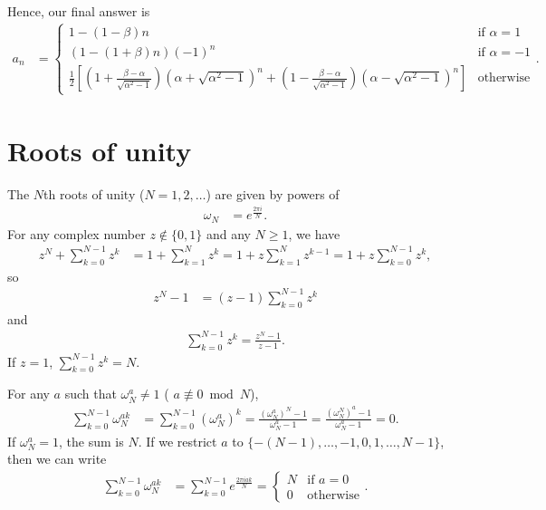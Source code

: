 Hence, our final answer is
\begin{align}
	a_n
	&= \begin{cases}
			1 - (1 - \beta) n & \text{if } \alpha = 1 \\
			(1 - (1 + \beta) n) (-1)^n & \text{if } \alpha = -1 \\
			\frac{1}{2} \left[
					\left( 1 + \frac{\beta - \alpha}{\sqrt{\alpha^2 - 1}} \right) \left( \alpha + \sqrt{\alpha^2 - 1} \right)^n
					+ \left( 1 - \frac{\beta - \alpha}{\sqrt{\alpha^2 - 1}} \right) \left( \alpha - \sqrt{\alpha^2 - 1} \right)^n
			\right] & \text{otherwise}
		\end{cases}.
			\label{eq:recurrence-relation}
\end{align}


\section{Roots of unity}

The $N$th roots of unity ($N = 1, 2, \ldots$) are given by powers of
\begin{align}
	\omega_N
	&= e^{\frac{2 \pi i}{N}}.
\end{align}
For any complex number $z \not\in \{ 0, 1 \}$ and any $N \ge 1$, we have
\begin{align}
	z^N + \sum_{k=0}^{N-1} z^k
	&= 1 + \sum_{k=1}^{N} z^k
	= 1 + z \sum_{k=1}^{N} z^{k-1}
	= 1 + z \sum_{k=0}^{N-1} z^k,
\end{align}
so
\begin{align}
	z^N - 1
	&= (z - 1) \sum_{k=0}^{N-1} z^k
\end{align}
and
\begin{align}
	\sum_{k=0}^{N-1} z^k
	= \frac{z^N - 1}{z - 1}.
\end{align}
If $z = 1$, $\sum_{k=0}^{N-1} z^k = N$.

For any $a$ such that $\omega_N^a \ne 1$ (\ie{} $a \not\equiv 0 \bmod{N}$),
\begin{align}
	\sum_{k=0}^{N-1} \omega_N^{a k}
	&= \sum_{k=0}^{N-1} (\omega_N^a)^k
	= \frac{(\omega_N^a)^N - 1}{\omega_N^a - 1}
	= \frac{(\omega_N^N)^a - 1}{\omega_N^a - 1}
	= 0.
\end{align}
If $\omega_N^a = 1$, the sum is $N$.
If we restrict $a$ to $\{ -(N-1), \ldots, -1, 0, 1, \ldots, N-1 \}$, then we can write
\begin{align}
	\sum_{k=0}^{N-1} \omega_N^{a k}
	&= \sum_{k=0}^{N-1} e^{\frac{2 \pi i a k}{N}}
	= \begin{cases}
			N & \text{if } a = 0 \\
			0 & \text{otherwise}
		\end{cases}.
			\label{eq:roots-of-unity-sum}
\end{align}


